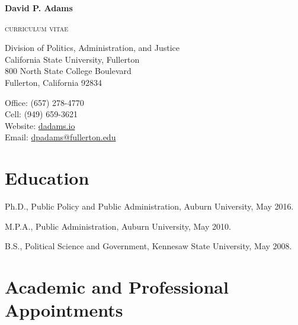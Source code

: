 \documentclass[12pt,letterpaper]{article}
\def\name{David P. Adams}
\renewenvironment{itemize}{
  \begin{list}{}{
    \setlength{\leftmargin}{1.5em}
    \setlength{\itemsep}{0.25em}
    \setlength{\parskip}{0pt}
    \setlength{\parsep}{0.25em}
  }
}{
  \end{list}
}
\begin{document}
    
    
\centerline{\huge \bf \name}
\smallskip
\centerline{\small{\textsc{curriculum vitae}}}

\bigskip

\noindent

\begin{minipage}[t]{0.55\textwidth}
    Division of Politics, Administration, and Justice \\
    California State University, Fullerton \\
    800 North State College Boulevard  \\
    Fullerton, California 92834
\end{minipage}
\hfill
\begin{minipage}[t]{0.4\textwidth}
    Office: \hspace{6em}(657) 278-4770 \\
    Cell: \hspace{6.5em} (949) 659-3621 \\
    Website: \hspace{6.5em}\href{https://dadams.io}{dadams.io} \\
    Email: \hspace{1.2em}\href{mailto:dpadams@fullerton.edu}{dpadams@fullerton.edu}
\end{minipage}


  \section*{Education}

  \begin{itemize}\leftmargin=2pt\itemindent=-15pt
  \item Ph.D., Public Policy and Public Administration, Auburn University, May 2016. \vspace{0.2cm}
  \item M.P.A., Public Administration, Auburn University, May 2010. \vspace{0.2cm}
  \item B.S., Political Science and Government, Kennesaw State University, May 2008.
  \end{itemize}
  
  \section*{Academic and Professional Appointments}
\end{document}
